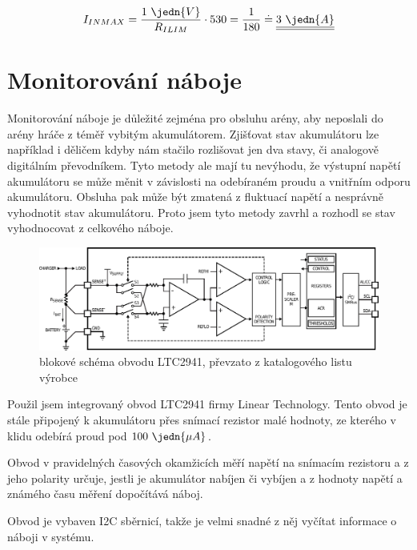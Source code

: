 $$I_{IN MAX} = \dfrac{1~\jedn{V}}{R_{ILIM}} \cdot 530 = \dfrac{1}{180} \doteq \underline{\underline{3~\jedn{A}}}$$ \nonumber

\section{Monitorování náboje}
Monitorování náboje je důležité zejména pro obsluhu arény, aby neposlali do arény hráče z téměř vybitým akumulátorem. Zjišťovat stav akumulátoru lze například i děličem kdyby nám stačilo rozlišovat jen dva stavy, či analogově digitálním převodníkem. Tyto metody ale mají tu nevýhodu, že výstupní napětí akumulátoru se může měnit v závislosti na odebíraném proudu a vnitřním odporu akumulátoru. Obsluha pak může být zmatená z fluktuací napětí a nesprávně vyhodnotit stav akumulátoru. Proto jsem tyto metody zavrhl a rozhodl se stav vyhodnocovat z celkového náboje.

\begin{figure}[H]
    \begin{center}
        \includegraphics[width=\textwidth]{img/LTC2941-block}
    \end{center}
    \caption{blokové schéma obvodu LTC2941, převzato z katalogového listu výrobce}
\end{figure}
Použil jsem integrovaný obvod LTC2941 firmy Linear Technology. Tento obvod je stále připojený k akumulátoru přes snímací rezistor malé hodnoty, ze kterého v klidu odebírá proud pod $100~\jedn{\mu A}$.

Obvod v pravidelných časových okamžicích měří napětí na snímacím rezistoru a z jeho polarity určuje, jestli je akumulátor nabíjen či vybíjen a z hodnoty napětí a známého času měření dopočítává náboj.

Obvod je vybaven I2C sběrnicí, takže je velmi snadné z něj vyčítat informace o náboji v systému.

